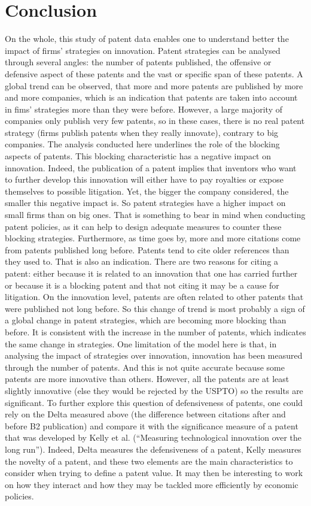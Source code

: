 \documentclass[12pt]{article}
\begin{document}
\section{Conclusion}
On the whole, this study of patent data enables one to understand better the impact of firms’ strategies on innovation. Patent strategies can be analysed through several angles: the number of patents published, the offensive or defensive aspect of these patents and the vast or specific span of these patents. 
A global trend can be observed, that more and more patents are published by more and more companies, which is an indication that patents are taken into account in fims’ strategies more than they were before. However, a large majority of companies only publish very few patents, so in these cases, there is no real patent strategy (firms publish patents when they really innovate), contrary to big companies. 
The analysis conducted here underlines the role of the blocking aspects of patents. This blocking characteristic has a negative impact on innovation. Indeed, the publication of a patent implies that inventors who want to further develop this innovation will either have to pay royalties or expose themselves to possible litigation. Yet, the bigger the company considered, the smaller this negative impact is. So patent strategies have a higher impact on small firms than on big ones. That is something to bear in mind when conducting patent policies, as it can help to design adequate measures to counter these blocking strategies. 
Furthermore, as time goes by, more and more citations come from patents published long before. Patents tend to cite older references than they used to. That is also an indication. There are two reasons for citing a patent: either because it is related to an innovation that one has carried further or because it is a blocking patent and that not citing it may be a cause for litigation. On the innovation level, patents are often related to other patents that were published not long before. So this change of trend is most probably a sign of a global change in patent strategies, which are becoming more blocking than before. It is consistent with the increase in the number of patents, which indicates the same change in strategies. 
One limitation of the model here is that, in analysing the impact of strategies over innovation, innovation has been measured through the number of patents. And this is not quite accurate because some patents are more innovative than others. However, all the patents are at least slightly innovative (else they would be rejected by the USPTO) so the results are significant. 
To further explore this question of defensiveness of patents, one could rely on the Delta measured above (the difference between citations after and before B2 publication) and compare it with the significance measure of a patent that was developed by Kelly et al. (“Measuring technological innovation over the long run”). Indeed, Delta measures the defensiveness of a patent, Kelly measures the novelty of a patent, and these two elements are the main characteristics to consider when trying to define a patent value. It may then be interesting to work on how they interact and how they may be tackled more efficiently by economic policies. 
\newpage
\end{document}
